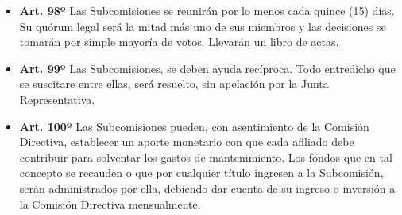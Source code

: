 \documentclass[]{book}
\providecommand{\tightlist}{%
  \setlength{\itemsep}{0pt}\setlength{\parskip}{0pt}}
\begin{document}
\begin{itemize}
\tightlist
\item
  \textbf{Art. 98º} Las Subcomisiones se reunirán por lo menos cada
  quince (15) días. Su quórum legal será la mitad más uno de sus
  miembros y las decisiones se tomarán por simple mayoría de votos.
  Llevarán un libro de actas.
\end{itemize}

\begin{itemize}
\tightlist
\item
  \textbf{Art. 99º} Las Subcomisiones, se deben ayuda recíproca. Todo
  entredicho que se suscitare entre ellas, será resuelto, sin apelación
  por la Junta Representativa.
\end{itemize}

\begin{itemize}
\tightlist
\item
  \textbf{Art. 100º} Las Subcomisiones pueden, con asentimiento de la
  Comisión Directiva, establecer un aporte monetario con que cada
  afiliado debe contribuir para solventar los gastos de mantenimiento.
  Los fondos que en tal concepto se recauden o que por cualquier título
  ingresen a la Subcomisión, serán administrados por ella, debiendo dar
  cuenta de su ingreso o inversión a la Comisión Directiva mensualmente.
\end{itemize}
\end{document}
